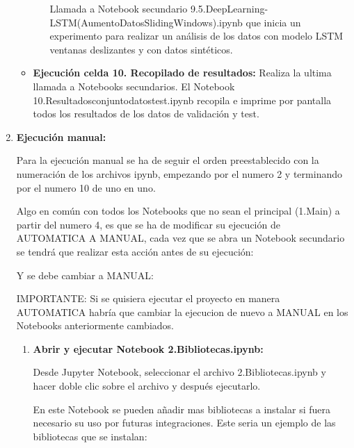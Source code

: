 \begin{enumerate}
\begin{itemize}
\begin{enumerate}
	Llamada a Notebook secundario 9.5.DeepLearning-LSTM(AumentoDatosSlidingWindows).ipynb que inicia un experimento para realizar un análisis de los datos con modelo LSTM ventanas deslizantes y con datos sintéticos.	
	\end{enumerate} 
	
   \item
   \textbf{Ejecución celda 10. Recopilado de resultados: } 	
	Realiza la ultima llamada a Notebooks secundarios. El Notebook 10.Resultadosconjuntodatostest.ipynb recopila e imprime por pantalla todos los resultados de los datos de validación y test.


	
  \end{itemize}
  
  
  
 \item \textbf{Ejecución manual:}
 
 Para la ejecución manual se ha de seguir el orden preestablecido con la numeración de los archivos ipynb, empezando por el numero 2 y terminando por el numero 10 de uno en uno. 
 
Algo en común con todos los Notebooks que no sean el principal (1.Main) a partir del numero 4, es que se ha de modificar su ejecución de AUTOMATICA A MANUAL, cada vez que se abra un Notebook secundario se tendrá que realizar esta acción antes de su ejecución:


Y se debe cambiar a MANUAL:

 
IMPORTANTE: Si se quisiera ejecutar el proyecto en manera AUTOMATICA habría que cambiar la ejecucion de nuevo a MANUAL en los Notebooks anteriormente cambiados.
 
	\begin{enumerate}
	\def\labelenumi{\arabic{enumi}.}
	\tightlist
	\item 
	\textbf{Abrir y ejecutar Notebook 2.Bibliotecas.ipynb:} 
    
    Desde Jupyter Notebook, seleccionar el archivo 2.Bibliotecas.ipynb y hacer doble clic sobre el archivo y después ejecutarlo.
    
     En este Notebook se pueden añadir mas bibliotecas a instalar si fuera necesario su uso por futuras integraciones. Este seria un ejemplo de las bibliotecas que se instalan:
    

\end{enumerate}
\end{enumerate}
